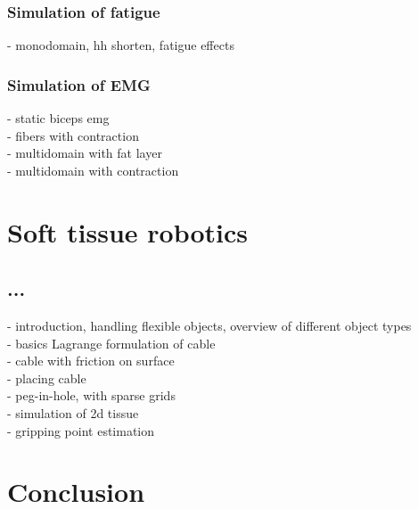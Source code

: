     \section{Simulation of fatigue}
    - monodomain, hh  shorten, fatigue effects
    \section{Simulation of EMG}
    - static biceps emg\\
    - fibers with contraction\\
    - multidomain with fat layer\\
    - multidomain with contraction\\

\part{Soft tissue robotics}
\chapter{...}
  - introduction, handling flexible objects, overview of different object types\\
  - basics Lagrange formulation of cable\\
  - cable with friction on surface\\
  - placing cable\\
  - peg-in-hole, with sparse grids\\
  - simulation of 2d tissue\\
  - gripping point estimation\\
  
  \cite{Maier2021}
  
\part{Conclusion}

\newpage
%
\printbibliography[%
  title=Bibliography
]


%



%
